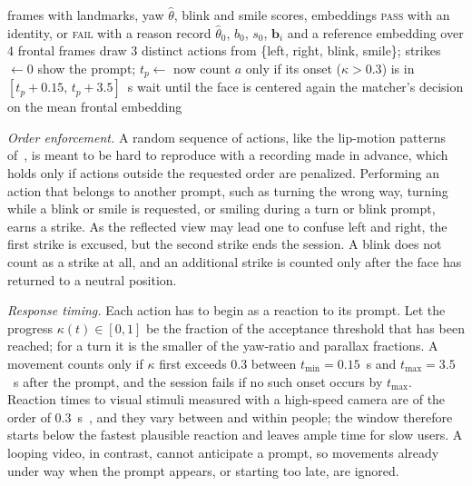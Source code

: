 \documentclass[journal]{IEEEtran}
\begin{document}
\begin{algorithm}[!t]
\caption{Face-unlock liveness session}\label{alg:live}
\footnotesize
\begin{algorithmic}[1]
\Require frames with landmarks, yaw $\hat\theta$, blink and smile scores, embeddings
\Ensure \textsc{pass} with an identity, or \textsc{fail} with a reason
\State record $\hat\theta_0$, $b_0$, $s_0$, $\mathbf{b}_i$ and a reference embedding over 4 frontal frames
\State draw 3 distinct actions from \{left, right, blink, smile\}; strikes $\gets 0$
  \State show the prompt; $t_p\gets$ now
  \Repeat
    \State count $a$ only if its onset ($\kappa>0.3$) is in $[t_p{+}0.15,\,t_p{+}3.5]$~s
  \State wait until the face is centered again
\EndFor
\State \Return the matcher's decision on the mean frontal embedding
\end{algorithmic}
\end{algorithm}

\emph{Order enforcement.} A random sequence of actions, like the lip-motion patterns of~\cite{zhou2024lipmotion}, is meant to be hard to reproduce with a recording made in advance, which holds only if actions outside the requested order are penalized. Performing an action that belongs to another prompt, such as turning the wrong way, turning while a blink or smile is requested, or smiling during a turn or blink prompt, earns a strike. As the reflected view may lead one to confuse left and right, the first strike is excused, but the second strike ends the session. A blink does not count as a strike at all, and an additional strike is counted only after the face has returned to a neutral position.

\emph{Response timing.} Each action has to begin as a reaction to its prompt. Let the progress $\kappa(t)\in[0,1]$ be the fraction of the acceptance threshold that has been reached; for a turn it is the smaller of the yaw-ratio and parallax fractions. A movement counts only if $\kappa$ first exceeds 0.3 between $t_{\min}=0.15$~s and $t_{\max}=3.5$~s after the prompt, and the session fails if no such onset occurs by $t_{\max}$. Reaction times to visual stimuli measured with a high-speed camera are of the order of 0.3~s~\cite{tatsuno2016reaction}, and they vary between and within people; the window therefore starts below the fastest plausible reaction and leaves ample time for slow users. A looping video, in contrast, cannot anticipate a prompt, so movements already under way when the prompt appears, or starting too late, are ignored.
\end{document}
